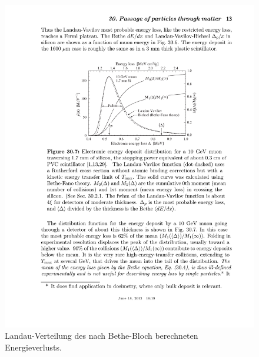 \begin{figure}
\centering
\includegraphics[]{./input/landau.pdf}\caption{Landau-Verteilung des nach Bethe-Bloch berechneten Energieverlusts.\cite{Passage_through_matter}}\label{fig:landau}
\end{figure}
